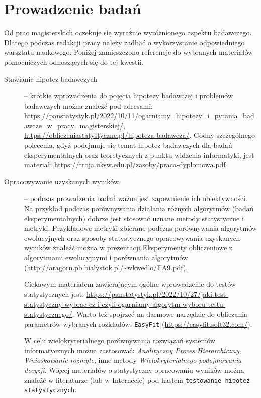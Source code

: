 \section{Prowadzenie badań}
Od prac magisterskich oczekuje się wyraźnie wyróżnionego aspektu badawczego. Dlatego podczas redakcji pracy należy zadbać o wykorzystanie odpowiedniego warsztatu naukowego. Poniżej zamieszczono referencje do wybranych materiałów pomocniczych odnoszących się do tej kwestii. 
\begin{description}
\item[Stawianie hipotez badawczych] -- krótkie wprowadzenia do pojęcia hipotezy badawczej i problemów badawczych można znaleźć pod adresami: 
\url{https://panstatystyk.pl/2022/10/11/ogarniamy_hipotezy_i_pytania_badawcze_w_pracy_magisterskiej/}, \url{https://obliczeniastatystyczne.pl/hipoteza-badawcza/}.
Godny szczególnego polecenia, gdyż podejmuje się temat hipotez badawczych dla badań eksperymentalnych oraz teoretycznych z punktu widzenia informatyki, jest materiał:
\url{https://troja.uksw.edu.pl/zasoby/praca-dyplomowa.pdf}

\item[Opracowywanie uzyskanych wyników] -- podczas prowadzenia badań ważne jest zapewnienie ich obiektywności. Na przykład podczas porównywania działania różnych algorytmów (badań eksperymentalnych) dobrze jest stosować uznane metody statystyczne i metryki. Przykładowe metryki zbierane podczas porównywania algorytmów ewolucyjnych oraz sposoby statystycznego opracowywania uzyskanych wyników znaleźć można w prezentacji Eksperymenty obliczeniowe z algorytmami
ewolucyjnymi i porównania algorytmów (\url{http://aragorn.pb.bialystok.pl/~wkwedlo/EA9.pdf}).

Ciekawym materiałem zawierającym ogólne wprowadzenie do testów statystycznych jest: \url{https://panstatystyk.pl/2022/10/27/jaki-test-statystyczny-wybrac-cz-i-czyli-ogarniamy-algorytm-wyboru-testu-statystycznego/}. Warto też spojrzeć na darmowe narzędzie do obliczania parametrów wybranych rozkładów: \texttt{EasyFit} (\url{https://easyfit.soft32.com/}).

W celu wielokryterialnego porównywania rozwiązań systemów informatycznych można zastosować: \emph{Analityczny Proces Hierarchiczny}, \emph{Wnioskowanie rozmyte}, inne metody \emph{Wielokryterialnego podejmowania decyzji}. Więcej materiałów o statystyczny opracowaniu wyników można znaleźć w literaturze (lub w Internecie) pod hasłem \texttt{testowanie hipotez statystycznych}.
\end{description}
